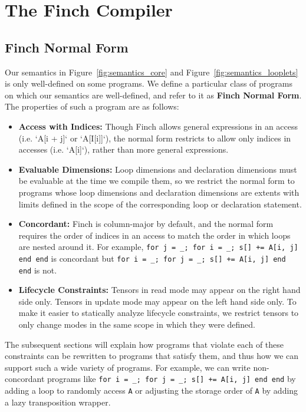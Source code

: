 \section{The Finch Compiler}

\subsection{Finch Normal Form}

Our semantics in Figure~\ref{fig:semantics_core} and Figure~\ref{fig:semantics_looplets} is only
well-defined on some programs. We define a particular class of programs on which
our semantics are well-defined, and refer to it as \textbf{Finch Normal Form}.
The properties of such a program are as follows:
\begin{itemize}
    \item \textbf{Access with Indices:} Though Finch allows general expressions in an
    access (i.e. `A[i + j]` or `A[I[i]]`), the normal form restricts to allow only indices in 
    accesses (i.e. `A[i]`), rather than more general expressions.
    \item \textbf{Evaluable Dimensions:} Loop dimensions and declaration dimensions must
    be evaluable at the time we compile them, so we restrict the normal form to
    programs whose loop dimensions and declaration dimensions are extents with
    limits defined in the scope of the corresponding loop or declaration
    statement.
    \item \textbf{Concordant:} Finch is column-major by default, and the normal form
    requires the order of indices in an access to match the order in which loops
    are nested around it.  For example,
    \texttt{for j = _; for i = _; s[] += A[i, j] end end}
    is concordant but
    \texttt{for i = _; for j = _; s[] += A[i, j] end end} is not.
    \item \textbf{Lifecycle Constraints:} Tensors in read mode may appear on the right
    hand side only. Tensors in update mode may appear on the left hand side
    only. To make it easier to statically analyze lifecycle constraints, we
    restrict tensors to only change modes in the same scope in which they were
    defined.
\end{itemize}

The subsequent sections will explain how programs that violate each of these
constraints can be rewritten to programs that satisfy them, and thus how we can
support such a wide variety of programs. For example, we can write non-concordant
programs like  \texttt{for i = _; for j = _; s[] += A[i, j] end end}
by adding a loop to randomly access \texttt{A} or adjusting the
storage order of \texttt{A} by adding a lazy transposition wrapper.

